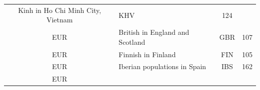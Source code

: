 \documentclass[]{book}
\theoremstyle{definition}
\theoremstyle{definition}
\theoremstyle{definition}
\theoremstyle{remark}
\begin{document}
\begin{longtable}[]{@{}clcc@{}}
\begin{minipage}[t]{0.59\columnwidth}
Kinh in Ho Chi Minh City, Vietnam\strut
\end{minipage} & \begin{minipage}[t]{0.09\columnwidth}\centering\strut
KHV\strut
\end{minipage} & \begin{minipage}[t]{0.07\columnwidth}\centering\strut
124\strut
\end{minipage}\tabularnewline
\begin{minipage}[t]{0.14\columnwidth}\centering\strut
EUR\strut
\end{minipage} & \begin{minipage}[t]{0.59\columnwidth}\raggedright\strut
British in England and Scotland\strut
\end{minipage} & \begin{minipage}[t]{0.09\columnwidth}\centering\strut
GBR\strut
\end{minipage} & \begin{minipage}[t]{0.07\columnwidth}\centering\strut
107\strut
\end{minipage}\tabularnewline
\begin{minipage}[t]{0.14\columnwidth}\centering\strut
EUR\strut
\end{minipage} & \begin{minipage}[t]{0.59\columnwidth}\raggedright\strut
Finnish in Finland\strut
\end{minipage} & \begin{minipage}[t]{0.09\columnwidth}\centering\strut
FIN\strut
\end{minipage} & \begin{minipage}[t]{0.07\columnwidth}\centering\strut
105\strut
\end{minipage}\tabularnewline
\begin{minipage}[t]{0.14\columnwidth}\centering\strut
EUR\strut
\end{minipage} & \begin{minipage}[t]{0.59\columnwidth}\raggedright\strut
Iberian populations in Spain\strut
\end{minipage} & \begin{minipage}[t]{0.09\columnwidth}\centering\strut
IBS\strut
\end{minipage} & \begin{minipage}[t]{0.07\columnwidth}\centering\strut
162\strut
\end{minipage}\tabularnewline
\begin{minipage}[t]{0.14\columnwidth}\centering\strut
EUR\strut
\end{minipage} & \begin{minipage}[t]{0.59\columnwidth}\raggedright\strut

\end{minipage}
\end{longtable}
\end{document}
